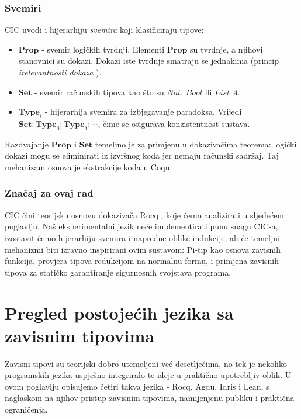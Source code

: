 \documentclass[diplomskirad,upload]{fer}
\begin{document}
\subsection{Svemiri}

CIC uvodi i hijerarhiju \emph{svemira}  koji klasificiraju
tipove:

\begin{itemize}
    \item \(\mathbf{Prop}\) - svemir logičkih tvrdnji. Elementi \(\mathbf{Prop}\)
    su tvrdnje, a njihovi stanovnici su dokazi. Dokazi iste tvrdnje smatraju se
        jednakima (princip \emph{irelevantnosti dokaza} ).
    \item \(\mathbf{Set}\) - svemir računskih tipova kao što su \(Nat\),
    \(Bool\) ili \(List\ A\).
    \item \(\mathbf{Type}_i\) - hijerarhija svemira za izbjegavanje paradoksa.
    Vrijedi \(\mathbf{Set} : \mathbf{Type}_0 : \mathbf{Type}_1 : \cdots\), čime
    se osigurava konzistentnost sustava.
\end{itemize}

Razdvajanje \(\mathbf{Prop}\) i \(\mathbf{Set}\) temeljno je za primjenu u
dokazivačima teorema: logički dokazi mogu se eliminirati iz izvršnog koda jer
nemaju računski sadržaj. Taj mehanizam osnova je ekstrakcije koda u Coqu.

\subsection{Značaj za ovaj rad}

CIC čini teorijsku osnovu dokazivača Rocq \cite{rocq}, koje ćemo
analizirati u sljedećem poglavlju. Naš eksperimentalni jezik neće implementirati
punu snagu CIC-a, izostavit ćemo hijerarhiju svemira i napredne oblike
indukcije, ali će temeljni mehanizmi biti izravno inspirirani ovim sustavom:
Pi-tip kao osnova zavisnih funkcija, provjera tipova redukcijom na normalnu
formu, i primjena zavisnih tipova za statičko garantiranje sigurnosnih svojstava
programa.

\chapter{Pregled postojećih jezika sa zavisnim tipovima}

Zavisni tipovi su teorijski dobro utemeljeni već desetljećima, no tek je
nekoliko programskih jezika uspješno integriralo te ideje u praktično upotrebljiv
oblik. U ovom poglavlju opisujemo četiri takva jezika - Rocq, Agdu,
Idris i Lean, s naglaskom na njihov pristup zavisnim tipovima, namijenjenu
publiku i praktična ograničenja.
\end{document}
